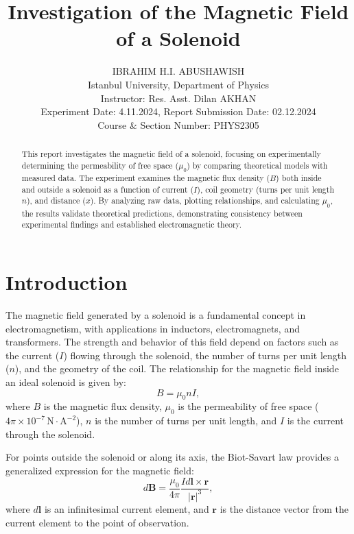 \documentclass[journal]{IEEEtran}
\begin{document}
\title{Investigation of the Magnetic Field of a Solenoid}
\author{IBRAHIM H.I. ABUSHAWISH \\
Istanbul University, Department of Physics \\
Instructor: Res. Asst. Dilan AKHAN \\
Experiment Date: 4.11.2024, Report Submission Date: 02.12.2024\\
Course \& Section Number: PHYS2305}

\maketitle

\begin{abstract}
This report investigates the magnetic field of a solenoid, focusing on experimentally determining the permeability of free space (\( \mu_0 \)) by comparing theoretical models with measured data. The experiment examines the magnetic flux density (\( B \)) both inside and outside a solenoid as a function of current (\( I \)), coil geometry (turns per unit length \( n \)), and distance (\( x \)). By analyzing raw data, plotting relationships, and calculating \( \mu_0 \), the results validate theoretical predictions, demonstrating consistency between experimental findings and established electromagnetic theory.
\end{abstract}

\section{Introduction}
The magnetic field generated by a solenoid is a fundamental concept in electromagnetism, with applications in inductors, electromagnets, and transformers. The strength and behavior of this field depend on factors such as the current (\( I \)) flowing through the solenoid, the number of turns per unit length (\( n \)), and the geometry of the coil. The relationship for the magnetic field inside an ideal solenoid is given by:
\begin{equation}
    B = \mu_0 n I, \label{eq:ideal_field}
\end{equation}
where \( B \) is the magnetic flux density, \( \mu_0 \) is the permeability of free space (\( 4\pi \times 10^{-7} \, \mathrm{N \cdot A^{-2}} \)), \( n \) is the number of turns per unit length, and \( I \) is the current through the solenoid.

For points outside the solenoid or along its axis, the Biot-Savart law provides a generalized expression for the magnetic field:
\begin{equation}
    d\mathbf{B} = \frac{\mu_0}{4\pi} \frac{I d\mathbf{l} \times \mathbf{r}}{|\mathbf{r}|^3}, \label{eq:biot_savart}
\end{equation}
where \( d\mathbf{l} \) is an infinitesimal current element, and \( \mathbf{r} \) is the distance vector from the current element to the point of observation.
\end{document}
